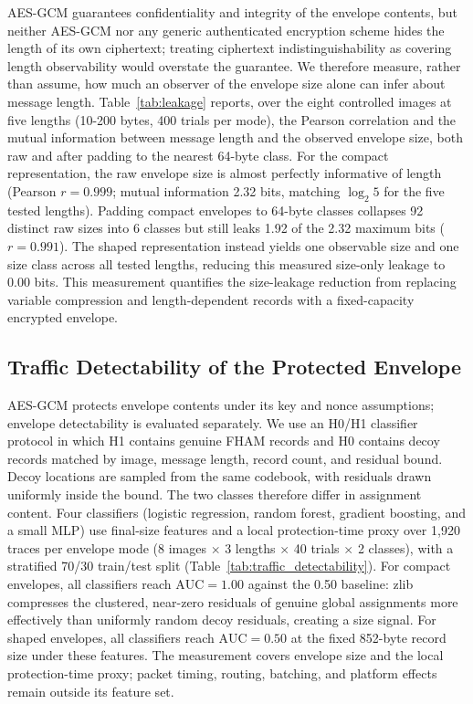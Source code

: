 \documentclass[preprint,12pt]{elsarticle}
\theoremstyle{plain}
\begin{document}
AES-GCM guarantees confidentiality and integrity of the envelope contents,
but neither AES-GCM nor any generic authenticated encryption scheme hides
the length of its own ciphertext; treating ciphertext indistinguishability as
covering length observability would overstate the guarantee. We therefore
measure, rather than assume, how much an observer of the envelope size alone
can infer about message length. Table~\ref{tab:leakage} reports, over the
eight controlled images at five lengths (10-200 bytes, 400 trials per mode),
the Pearson correlation and the mutual information between message length and
the observed envelope size, both raw and after padding to the nearest
64-byte class. For the compact representation, the raw envelope size is almost
perfectly informative of length (Pearson $r=0.999$; mutual information
2.32 bits, matching $\log_2 5$ for the five tested lengths). Padding compact
envelopes to 64-byte classes collapses 92 distinct raw sizes into 6 classes
but still leaks 1.92 of the 2.32 maximum bits ($r=0.991$). The shaped
representation instead yields one observable size and one size class across
all tested lengths, reducing this measured size-only leakage to 0.00 bits.
This measurement quantifies the size-leakage reduction from replacing
variable compression and length-dependent records with a fixed-capacity
encrypted envelope.

\begin{table}[!t]
\centering
\caption{Message-Length Leakage Through Envelope Size (64-Byte Padding Classes)}
\label{tab:leakage}
{\small\setlength{\tabcolsep}{4pt}}
\end{table}

\subsection{Traffic Detectability of the Protected Envelope}

AES-GCM protects envelope contents under its key and nonce assumptions;
envelope detectability is evaluated separately. We use an H0/H1 classifier
protocol in which H1 contains genuine FHAM records and H0 contains decoy
records matched by image, message length, record count, and residual bound.
Decoy locations are sampled from the same codebook, with residuals drawn
uniformly inside the bound. The two classes therefore differ in assignment
content. Four classifiers (logistic regression, random forest, gradient
boosting, and a small MLP) use final-size features and a local protection-time
proxy over 1,920 traces per envelope mode (8 images $\times$ 3 lengths
$\times$ 40 trials $\times$ 2 classes), with a stratified 70/30 train/test
split (Table~\ref{tab:traffic_detectability}). For compact envelopes, all
classifiers reach $\mathrm{AUC}=1.00$ against the 0.50 baseline: zlib
compresses the clustered, near-zero residuals of genuine global assignments
more effectively than uniformly random decoy residuals, creating a size
signal. For shaped envelopes, all classifiers reach $\mathrm{AUC}=0.50$ at
the fixed 852-byte record size under these features. The measurement covers
envelope size and the local protection-time proxy; packet timing, routing,
batching, and platform effects remain outside its feature set.
\end{document}
